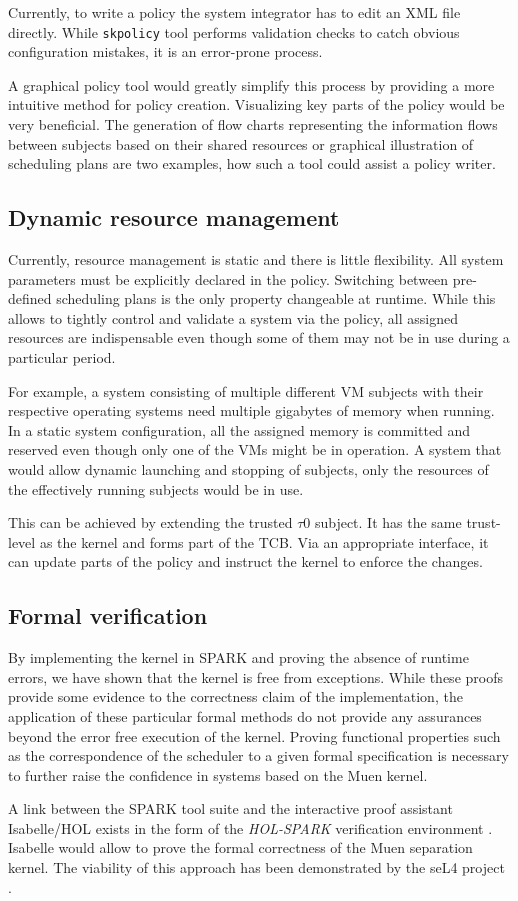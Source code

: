 Currently, to write a policy the system integrator has to edit an XML file
directly. While \texttt{skpolicy} tool performs validation checks to catch
obvious configuration mistakes, it is an error-prone process.

A graphical policy tool would greatly simplify this process by providing a more
intuitive method for policy creation. Visualizing key parts of the policy would
be very beneficial. The generation of flow charts representing the information
flows between subjects based on their shared resources or graphical illustration
of scheduling plans are two examples, how such a tool could assist a policy
writer.

\subsection{Dynamic resource management}
Currently, resource management is static and there is little flexibility. All
system parameters must be explicitly declared in the policy. Switching between
pre-defined scheduling plans is the only property changeable at runtime. While
this allows to tightly control and validate a system via the policy, all
assigned resources are indispensable even though some of them may not be in use
during a particular period.

For example, a system consisting of multiple different VM subjects with their
respective operating systems need multiple gigabytes of memory when running.
In a static system configuration, all the assigned memory is committed and
reserved even though only one of the VMs might be in operation. A system that
would allow dynamic launching and stopping of subjects, only the resources of
the effectively running subjects would be in use.

This can be achieved by extending the trusted $\tau$0 subject. It has the same
trust-level as the kernel and forms part of the TCB. Via an appropriate
interface, it can update parts of the policy and instruct the kernel to enforce
the changes.

\subsection{Formal verification}
By implementing the kernel in SPARK and proving the absence of runtime errors,
we have shown that the kernel is free from exceptions. While these proofs
provide some evidence to the correctness claim of the implementation, the
application of these particular formal methods do not provide any assurances
beyond the error free execution of the kernel. Proving functional properties
such as the correspondence of the scheduler to a given formal specification is
necessary to further raise the confidence in systems based on the Muen kernel.

A link between the SPARK tool suite and the interactive proof assistant
Isabelle/HOL exists in the form of the \emph{HOL-SPARK} verification
environment \cite{berghofer:OASIcs:2012:3587}. Isabelle would allow to prove
the formal correctness of the Muen separation kernel. The viability of this
approach has been demonstrated by the seL4 project \cite{Klein_EHACDEEKNSTW_09}.
